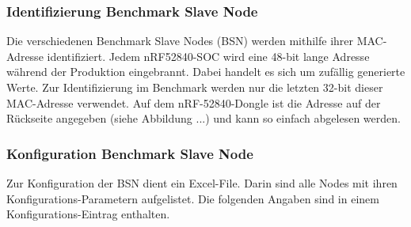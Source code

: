 \subsubsection{Identifizierung Benchmark Slave Node}\label{subsubsec:NodeIdentification}

Die verschiedenen Benchmark Slave Nodes (BSN) werden mithilfe ihrer MAC-Adresse identifiziert.
Jedem nRF52840-SOC wird eine 48-bit lange Adresse während der Produktion eingebrannt. Dabei handelt es sich um zufällig generierte Werte.
Zur Identifizierung im Benchmark werden nur die letzten 32-bit dieser MAC-Adresse verwendet.
Auf dem nRF-52840-Dongle ist die Adresse auf der Rückseite angegeben (siehe Abbildung ...) und kann so einfach abgelesen werden.



\subsubsection{Konfiguration Benchmark Slave Node}\label{subsubsec:NodeConfiguration}

Zur Konfiguration der BSN dient ein Excel-File. Darin sind alle Nodes mit ihren Konfigurations-Parametern aufgelistet. Die folgenden Angaben sind in einem Konfigurations-Eintrag enthalten. 

